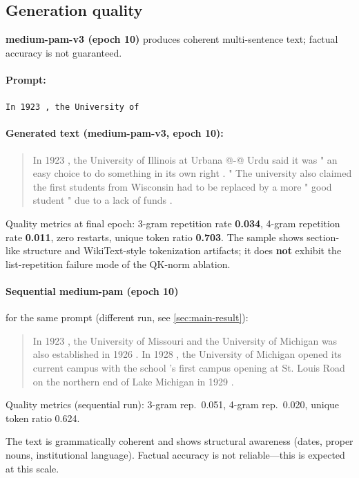 \documentclass[11pt]{article}
\begin{document}
\subsection{Generation quality}
\textbf{medium-pam-v3 (epoch 10)} produces coherent multi-sentence text; factual accuracy is not guaranteed.

\paragraph{Prompt:} \texttt{In 1923 , the University of}

\paragraph{Generated text (medium-pam-v3, epoch 10):}
\begin{quote}
In 1923 , the University of Illinois at Urbana @-@ Urdu said it was " an easy choice to do something in its own right . " The university also claimed the first students from Wisconsin had to be replaced by a more " good student " due to a lack of funds .
\end{quote}

Quality metrics at final epoch: 3-gram repetition rate \textbf{0.034}, 4-gram repetition rate \textbf{0.011}, zero restarts, unique token ratio \textbf{0.703}. The sample shows section-like structure and WikiText-style tokenization artifacts; it does \textbf{not} exhibit the list-repetition failure mode of the QK-norm ablation.

\paragraph{Sequential medium-pam (epoch 10)} for the same prompt (different run, see \cref{sec:main-result}):
\begin{quote}
In 1923 , the University of Missouri and the University of Michigan was also established in 1926 . In 1928 , the University of Michigan opened its current campus with the school 's first campus opening at St. Louis Road on the northern end of Lake Michigan in 1929 .
\end{quote}

Quality metrics (sequential run): 3-gram rep.\ 0.051, 4-gram rep.\ 0.020, unique token ratio 0.624.

The text is grammatically coherent and shows structural awareness (dates, proper nouns, institutional language). Factual accuracy is not reliable---this is expected at this scale.
\end{document}
